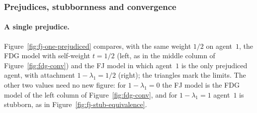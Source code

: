 \subsubsection{Prejudices, stubbornness and convergence}
\label{subsubsec:fj-stub-conv}

\paragraph{A single prejudice.}
Figure~\ref{fig:fj-one-prejudiced} compares, with the same weight $1/2$ on agent~$1$,
the FDG model with self-weight $t = 1/2$ (left, as in the middle column of
Figure~\ref{fig:fdg-conv}) and the FJ model in which agent~$1$ is the only prejudiced
agent, with attachment $1 - \lambda_1 = 1/2$ (right); the triangles mark the limits.
The other two values need no new
figure: for $1 - \lambda_1 = 0$ the FJ model is the FDG model of the left column of
Figure~\ref{fig:fdg-conv}, and for $1 - \lambda_1 = 1$ agent~$1$ is stubborn, as in
Figure~\ref{fig:fj-stub-equivalence}.

